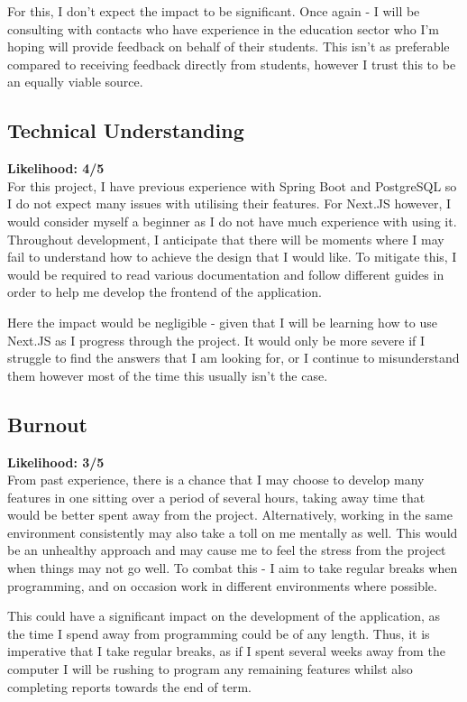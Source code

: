\documentclass[]{final_report}
\begin{document}
For this, I don't expect the impact to be significant. Once again - I will be consulting with contacts who have experience in the education sector who I'm hoping will provide feedback on behalf of their students. This isn't as preferable compared to receiving feedback directly from students, however I trust this to be an equally viable source.

\subsection*{Technical Understanding}
\textbf{Likelihood: 4/5}\\
For this project, I have previous experience with Spring Boot and PostgreSQL so I do not expect many issues with utilising their features. For Next.JS however, I would consider myself a beginner as I do not have much experience with using it. Throughout development, I anticipate that there will be moments where I may fail to understand how to achieve the design that I would like. To mitigate this, I would be required to read various documentation and follow different guides in order to help me develop the frontend of the application.

Here the impact would be negligible - given that I will be learning how to use Next.JS as I progress through the project. It would only be more severe if I struggle to find the answers that I am looking for, or I continue to misunderstand them however most of the time this usually isn't the case.

\subsection*{Burnout}
\textbf{Likelihood: 3/5}\\
From past experience, there is a chance that I may choose to develop many features in one sitting over a period of several hours, taking away time that would be better spent away from the project. Alternatively, working in the same environment consistently may also take a toll on me mentally as well. This would be an unhealthy approach and may cause me to feel the stress from the project when things may not go well. To combat this - I aim to take regular breaks when programming, and on occasion work in different environments where possible.

This could have a significant impact on the development of the application, as the time I spend away from programming could be of any length. Thus, it is imperative that I take regular breaks, as if I spent several weeks away from the computer I will be rushing to program any remaining features whilst also completing reports towards the end of term.
\end{document}
